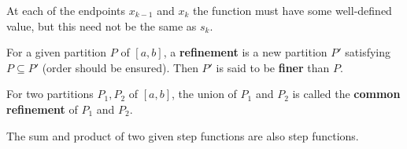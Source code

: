 	\begin{remarkenv}
		At each of the endpoints $x_{k-1}$ and $x_k$ the function must have some well-defined value, but this need not be the same as $s_k$.
	\end{remarkenv}
	\begin{definitionenv}
		For a given partition $P$ of $[a,b]$, a \textbf{refinement} is a new partition $P'$ satisfying $P\subseteq P'$ (order should be ensured). Then $P'$ is said to be \textbf{finer} than $P$.
	\end{definitionenv}
	\begin{definitionenv}
		For two partitions $P_1,P_2$ of $[a,b]$, the union of $P_1$ and $P_2$ is called the \textbf{common refinement} of $P_1$ and $P_2$.
	\end{definitionenv}
	\begin{theoremenv}
		The sum and product of two given step functions are also step functions.
	\end{theoremenv}
	
